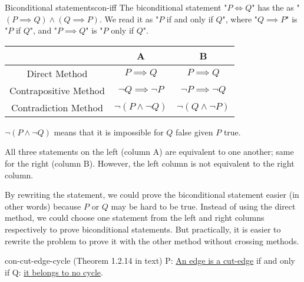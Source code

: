 \documentclass[../src/handouts/main.tex]{subfiles}
\begin{document}
\begin{remark}{Biconditional statements}{con-iff}
  The biconditional statement "$P \iff Q$" has the as "$(P \implies Q) \land (Q \implies P)$. We read it as "$P$ if and only if $Q$", where "$Q \implies P$" is "$P$ if $Q$", and "$P \implies Q$" is "$P$ only if $Q$".

  \begin{center}
    \begin{tabular}{ccc}
      \hline
                            & A                        & B                        \\ \hline
      Direct Method         & $P \implies Q$           & $P \implies Q$           \\
      Contrapositive Method & $\neg Q \implies \neg P$ & $\neg P \implies \neg Q$ \\
      Contradiction Method  & $\neg (P \land \neg Q)$  & $\neg (Q \land \neg P)$  \\
      \hline
    \end{tabular}
  \end{center}

  $\neg (P \land \neg Q)$ means that it is impossible for $Q$ false given $P$ true.

  All three statements on the left (column A) are equivalent to one another; same for the right (column B). However, the left column is not equivalent to the right column.

  By rewriting the statement, we could prove the biconditional statement easier (in other words) because $P$ or $Q$ may be hard to be true.
  Instead of using the direct method, we could choose one statement from the left and right columns respectively to prove biconditional statements.
  But practically, it is easier to rewrite the problem to prove it with the other method without crossing methods.
\end{remark}

\begin{theorem}{}{con-cut-edge-cycle}
  (Theorem 1.2.14 in text)
  P: \underline{An edge is a cut-edge} if and only if Q: \underline{it belongs to no cycle}.
\end{theorem}
\end{document}

